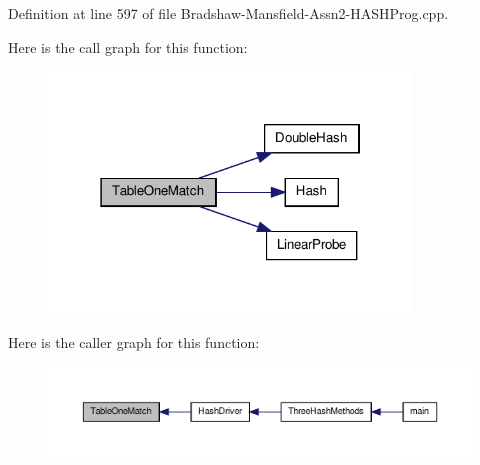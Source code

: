 Definition at line 597 of file Bradshaw-\/Mansfield-\/Assn2-\/HASHProg.cpp.



Here is the call graph for this function:\nopagebreak
\begin{figure}[H]
\begin{center}
\leavevmode
\includegraphics[width=274pt]{_bradshaw-_mansfield-_assn2-_h_a_s_h_prog_8cpp_a1cfe5833c4e03ff0473ca3e3b87f9f1d_cgraph}
\end{center}
\end{figure}




Here is the caller graph for this function:\nopagebreak
\begin{figure}[H]
\begin{center}
\leavevmode
\includegraphics[width=400pt]{_bradshaw-_mansfield-_assn2-_h_a_s_h_prog_8cpp_a1cfe5833c4e03ff0473ca3e3b87f9f1d_icgraph}
\end{center}
\end{figure}


